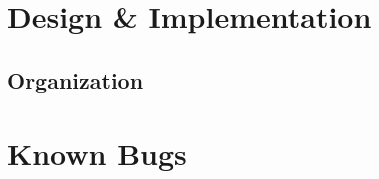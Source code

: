 \documentclass[paper=a4, fontsize=11pt]{scrartcl}
\begin{document}
\section*{Design \& Implementation}
\subsection*{Organization}




\section*{Known Bugs}
\end{document}
